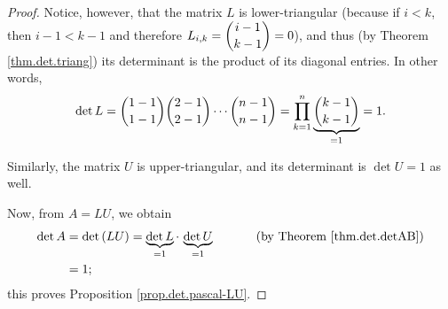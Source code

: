 \begin{proof}
Notice, however, that the matrix $L$ is lower-triangular (because if $i<k$,
then $i-1<k-1$ and therefore $L_{i,k}=\dbinom{i-1}{k-1}=0$), and thus (by
Theorem \ref{thm.det.triang}) its determinant is the product of its diagonal
entries. In other words,%
\[
\det L=\dbinom{1-1}{1-1}\dbinom{2-1}{2-1}\cdots\dbinom{n-1}{n-1}=\prod
_{k=1}^{n}\underbrace{\dbinom{k-1}{k-1}}_{=1}=1.
\]


Similarly, the matrix $U$ is upper-triangular, and its determinant is $\det
U=1$ as well.

Now, from $A=LU$, we obtain%
\begin{align*}
\det A  &  =\det\left(  LU\right)  =\underbrace{\det L}_{=1}\cdot
\,\underbrace{\det U}_{=1}\ \ \ \ \ \ \ \ \ \ \left(  \text{by Theorem
\ref{thm.det.detAB}}\right) \\
&  =1;
\end{align*}
this proves Proposition \ref{prop.det.pascal-LU}.
\end{proof}

